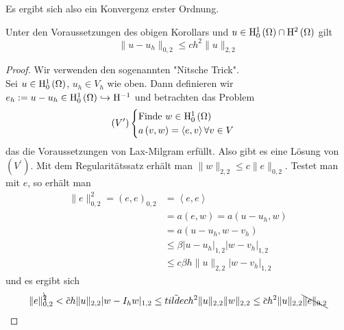 Es ergibt sich also ein Konvergenz erster Ordnung.

\begin{lemma}[Satz]
	Unter den Voraussetzungen des obigen Korollars und $u\in\mathrm{H}^{1}_{0}\left(\Omega\right)\cap\mathrm{H}^{2}\left(\Omega\right)$ gilt
	\begin{equation*}
		\|u-u_{h}\|_{0,2} \leq ch^{2}\|u\|_{2,2}
	\end{equation*}
\end{lemma}
\begin{proof}
	Wir verwenden den sogenannten "Nitsche Trick".\\
	Sei $u\in\mathrm{H}^{1}_{0}\left(\Omega\right)$, $u_{h}\in V_{h}$ wie oben. Dann definieren wir $e_{h} := u-u_{h}\in\mathrm{H}^{1}_{0}\left(\Omega\right)\hookrightarrow \mathrm{H}^{-1}$ und betrachten das Problem
	\begin{equation*}
		\left(V^{\prime}\right)\begin{cases}
			\text{Finde } w\in\mathrm{H}^{1}_{0}\left(\Omega\right)\\
			a\left(v,w\right) = \left<e,v\right> \forall v\in V
		\end{cases}
	\end{equation*}
	das die Voraussetzungen von Lax-Milgram erfüllt. Also gibt es eine Lösung von $\left(V^{\prime}\right)$. Mit dem Regularitätssatz erhält man $\|w\|_{2,2}\leq c\|e\|_{0,2}$. Testet man mit $e$, so erhält man
	\begin{align*}
		\|e\|_{0,2}^{2} = \left(e,e\right)_{0,2} &= \left<e,e\right>\\
			&= a\left(e,w\right) = a\left(u-u_{h},w\right)\\
			&= a\left(u-u_{h},w-v_{h}\right)\\
			&\leq \beta|u-u_{h}|_{1,2}|w-v_{h}|_{1,2}\\
			&\leq c\beta h\|u\|_{2,2}|w-v_{h}|_{1,2}
	\end{align*}
	und es ergibt sich
	\begin{equation*}
		\|e\|_{0,2}^{\bcancel{2}} < \tilde{c}h\|u\|_{2,2}|w-I_{h}w|_{1,2} \leq \tilde{tilde{c}}h^{2}\|u\|_{2,2}\|w\|_{2,2} \leq \overbar{c}h^{2}\|u\|_{2,2}\bcancel{\|e\|_{0,2}}
	\end{equation*}
\end{proof}
